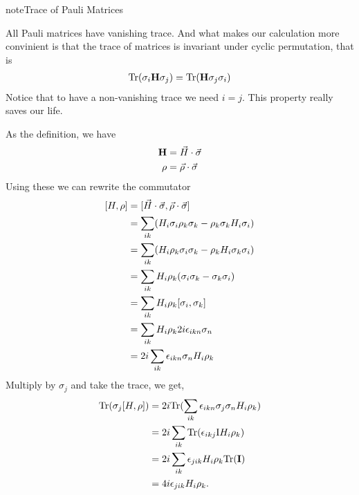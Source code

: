 \documentclass[letterpaper,12pt,english]{sphinxmanual}
\begin{document}
\begin{notice}{note}{Trace of Pauli Matrices}

All Pauli matrices have vanishing trace. And what makes our calculation more convinient is that the trace of matrices is invariant under cyclic permutation, that is
\begin{gather}
\begin{split}\mathrm{Tr}(\sigma_i \mathbf H \sigma_j) = \mathrm{Tr}(\mathbf H \sigma_j\sigma_i)\end{split}\notag
\end{gather}
Notice that to have a non-vanishing trace we need \(i=j\). This property really saves our life.
\end{notice}

As the definition, we have
\begin{gather}
\begin{split}\mathbf H &= \vec H\cdot \vec\sigma \\
\rho & = \vec \rho \cdot \vec \sigma\end{split}\notag
\end{gather}
Using these we can rewrite the commutator
\begin{gather}
\begin{split}[H,\rho] & = [\vec H \cdot \vec\sigma, \vec \rho \cdot \vec \sigma] \\
& = \sum_{ik}(H_i \sigma_i \rho_k \sigma_k - \rho_k \sigma_k H_i \sigma_i )\\
& = \sum_{ik}(H_i\rho_k \sigma_i\sigma_k - \rho_k H_i \sigma_k \sigma_i) \\
& = \sum_{ik} H_i\rho_k (\sigma_i\sigma_k-\sigma_k\sigma_i) \\
& = \sum_{ik} H_i \rho_k [\sigma_i,\sigma_k] \\
& =  \sum_{ik} H_i \rho_k 2i \epsilon_{ikn}\sigma_n \\
& =  2i \sum_{ik}\epsilon_{ikn}\sigma_n H_i \rho_k\end{split}\notag
\end{gather}
Multiply by \(\sigma_j\) and take the trace, we get,
\begin{gather}
\begin{split}\mathrm{Tr}(\sigma_j [H,\rho]) & =  2i \mathrm{Tr}(\sum_{ik}\epsilon_{ikn}\sigma_j\sigma_n H_i \rho_k )\\
&= 2i \sum_{ik} \mathrm{Tr}(\epsilon_{ikj} \mathrm I  H_i \rho_k  ) \\
& = 2i \sum_{ik} \epsilon_{jik} H_i\rho_k  \mathrm{Tr}(\mathbf I) \\
& = 4i \epsilon_{jik}H_i\rho_k.\end{split}\notag
\end{gather}
\end{document}
